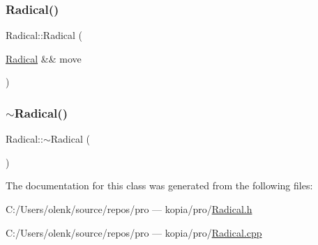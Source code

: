 \mbox{\label{class_radical_a4712deacbaf8409734cacbf8e40fd91d}} 
\subsubsection{\texorpdfstring{Radical()}{Radical()}\hspace{0.1cm}{\footnotesize\ttfamily [2/2]}}
{\footnotesize\ttfamily Radical\+::\+Radical (\begin{DoxyParamCaption}\item[{\mbox{\hyperlink{class_radical}{Radical}} \&\&}]{move }\end{DoxyParamCaption})}

\mbox{\label{class_radical_aca224836812f74dca7e4948bfa7ddf33}} 
\subsubsection{\texorpdfstring{$\sim$Radical()}{~Radical()}}
{\footnotesize\ttfamily Radical\+::$\sim$\+Radical (\begin{DoxyParamCaption}{ }\end{DoxyParamCaption})}



The documentation for this class was generated from the following files\+:\begin{DoxyCompactItemize}
\item 
C\+:/\+Users/olenk/source/repos/pro — kopia/pro/\mbox{\hyperlink{_radical_8h}{Radical.\+h}}\item 
C\+:/\+Users/olenk/source/repos/pro — kopia/pro/\mbox{\hyperlink{_radical_8cpp}{Radical.\+cpp}}\end{DoxyCompactItemize}
